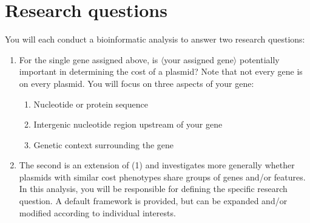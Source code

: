 \documentclass{article}
\begin{document}
\section*{Research questions}
You will each conduct a bioinformatic analysis to answer two research questions: 
\begin{enumerate}
    \item For the single gene assigned above, is $\langle$your assigned gene$\rangle$ potentially important in determining the cost of a plasmid? Note that not every gene is on every plasmid. You will focus on three aspects of your gene:
    \begin{enumerate}
        \item Nucleotide or protein sequence 
        \item Intergenic nucleotide region upstream of your gene
        \item Genetic context surrounding the gene
    \end{enumerate}
    \item The second is an extension of (1) and investigates more generally whether plasmids with similar cost phenotypes share groups of genes and/or features. In this analysis, you will be responsible for defining the specific research question. A default framework is provided, but can be expanded and/or modified according to individual interests.

\end{enumerate}
\end{document}
